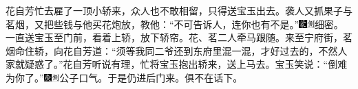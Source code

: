 花自芳忙去雇了一顶小轿来，众人也不敢相留，只得送宝玉出去。袭人又抓果子与茗烟，又把些钱与他买花炮放，教他：“不可告诉人，连你也有不是。”{\includegraphics[width=3mm]{../Images/00006}\includegraphics[width=3mm]{../Images/00011}\footnotesize \kaishu 细密。}一直送宝玉至门前，看着上轿，放下轿帘。花、茗二人牵马跟随。来至宁府街，茗烟命住轿，向花自芳道：“须等我同二爷还到东府里混一混，才好过去的，不然人家就疑惑了。”花自芳听说有理，忙将宝玉抱出轿来，送上马去。宝玉笑说：“倒难为你了。”{\includegraphics[width=3mm]{../Images/00004}\includegraphics[width=3mm]{../Images/00011}\footnotesize \kaishu 公子口气。}于是仍进后门来。俱不在话下。

